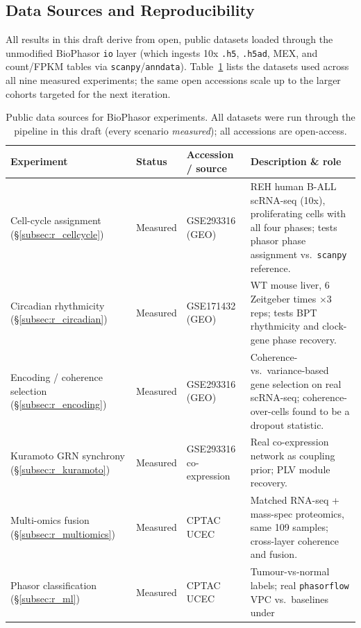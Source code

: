 \documentclass[preprint,12pt,amsmath,amssymb,superscriptaddress,floatfix]{revtex4-2}
\begin{document}
\subsection{Data Sources and Reproducibility}
\label{subsec:data_sources}

All results in this draft derive from open, public datasets loaded through
the unmodified BioPhasor \texttt{io} layer (which ingests 10x \texttt{.h5},
\texttt{.h5ad}, MEX, and count/FPKM tables via \texttt{scanpy}/\texttt{anndata}).
Table~\ref{tab:datasources} lists the datasets used across all nine measured
experiments; the same open accessions scale up to the larger cohorts targeted
for the next iteration.

\begin{table}[t]
\centering
\caption{Public data sources for BioPhasor experiments. All datasets were run
through the pipeline in this draft (every scenario \emph{measured}); all
accessions are open-access.}
\label{tab:datasources}
\begin{tabular}{p{3.4cm}p{1.5cm}p{3.6cm}p{5.6cm}}
\toprule
\textbf{Experiment} & \textbf{Status} & \textbf{Accession / source} & \textbf{Description \& role} \\
\midrule
Cell-cycle assignment (\S\ref{subsec:r_cellcycle}) & Measured & GSE293316 (GEO) &
REH human B-ALL scRNA-seq (10x), proliferating cells with all four phases;
tests phasor phase assignment vs.\ \texttt{scanpy} reference. \\
Circadian rhythmicity (\S\ref{subsec:r_circadian}) & Measured & GSE171432 (GEO) &
WT mouse liver, 6 Zeitgeber times $\times$3 reps; tests BPT rhythmicity and
clock-gene phase recovery. \\
\midrule
Encoding / coherence selection (\S\ref{subsec:r_encoding}) & Measured &
GSE293316 (GEO) & Coherence- vs.\ variance-based gene selection on real
scRNA-seq; coherence-over-cells found to be a dropout statistic. \\
Kuramoto GRN synchrony (\S\ref{subsec:r_kuramoto}) & Measured & GSE293316
co-expression & Real co-expression network as coupling prior; PLV module
recovery. \\
Multi-omics fusion (\S\ref{subsec:r_multiomics}) & Measured & CPTAC UCEC &
Matched RNA-seq + mass-spec proteomics, same 109 samples; cross-layer
coherence and fusion. \\
Phasor classification (\S\ref{subsec:r_ml}) & Measured & CPTAC UCEC &
Tumour-vs-normal labels; real \texttt{phasorflow} VPC vs.\ baselines under

\end{tabular}
\end{table}
\end{document}
